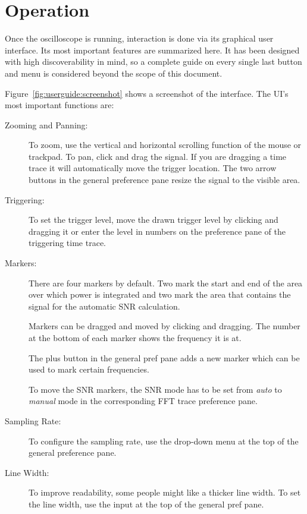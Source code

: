 \chapter{Operation} %
\label{ch:userguide:operation}

Once the oscilloscope  is running, interaction is done via  its graphical user
interface. Its  most important  features  are summarized  here.   It has  been
designed  with high  discoverability in  mind, so  a complete  guide on  every
single last button and menu is considered beyond the scope of this document.

Figure~\ref{fig:userguide:screenshot}  shows a  screenshot  of the  interface.
The UI's most important functions are:
\begin{description}
    \item[Zooming and Panning:]
        To zoom,  use the  vertical and horizontal  scrolling function  of the
        mouse or  trackpad.  To  pan, click  and drag  the signal. If  you are
        dragging a time trace it will automatically move the trigger location.
        The two arrow buttons in the general preference pane resize the signal
        to the visible area.
    \item[Triggering:]
        To set the trigger level, move the drawn trigger level by clicking and
        dragging it  or enter the level  in numbers on the  preference pane of
        the triggering time trace.
    \item[Markers:]
        There are four  markers by default. Two mark the start  and end of the
        area  over which  power  is  integrated and  two  mark  the area  that
        contains the signal for the automatic SNR calculation.

        Markers can be dragged and  moved by clicking and dragging. The number
        at the bottom of each marker shows the frequency it is at.

        The plus button in  the general pref pane adds a  new marker which can
        be used to mark certain frequencies.

        To move the SNR  markers, the SNR mode has to  be set from \emph{auto}
        to \emph{manual} mode in the corresponding FFT trace preference pane.
    \item[Sampling Rate:]
        To configure the  sampling rate, use the drop-down menu  at the top of
        the general preference pane.
    \item[Line Width:]
        To  improve  readability,  some  people  might  like  a  thicker  line
        width. To set the line width, use the  input at the top of the general
        pref pane.
\end{description}

